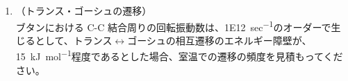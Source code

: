 \documentclass[a4paper,11pt]{jlreq}
\begin{document}
\begin{enumerate}
\begin{enumerate}
			\item
			\label{it:2-5}
			（持続長）\\
			このメモでは詳細に立ち入りませんが、高分子鎖の曲がりやすさを考慮したモデルとして、ミミズ鎖（Worm-like chain）と呼ばれるものがあります。
			このモデルにおいては、粗視化した単位として、モノマー単位が平面ジグザグ構造でまっすぐにつながる長さを統計的に見積もって、「持続長 $l_p$」と呼ぶものを使います。\\
			持続長は、以下の表式で表すことができます。
			\begin{equation*}
			l_p = l_0 \exp \left( - \dfrac{\Delta \varepsilon}{k_B T} \right)
			\end{equation*}
			ここで、$l_0$ はモノマー単位の長さであり、ポリエチレンの場合は、結合の結合長\qty{0.154}{nm}を用います。\\
			この式を用いて、上記のポリエチレンの場合の持続長を求めてください。\\
			（ヒント）\\
			結局、統計的に見てトランス連鎖が続く状態を考えて、その具体的な長さを見ているだけです。
	\end{enumerate}
	\item
	\label{it:2-6}
	（トランス・ゴーシュの遷移）\\
	ブタンにおける C-C 結合周りの回転振動数は、\qty{1E12}{sec^{-1}}のオーダーで生じるとして、トランス$\leftrightarrow$ゴーシュの相互遷移のエネルギー障壁が、\qty{15}{kJ mol^{-1}}程度であるとした場合、室温での遷移の頻度を見積もってください。
\end{enumerate}
\end{document}
